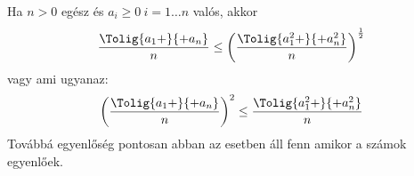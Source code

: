    Ha $n>0$ egész és $a_{i}\ge 0\ i=1\hdots n$ valós, akkor
   \begin{equation*}
   \frac{\Tolig{a_{1}+}{+a_{n}}}{n} \le 
   {\left( \frac{\Tolig{a_{1}^{2}+}{+a_{n}^{2}}}{n} \right) }^{\frac{1}{2}}
   \end{equation*}
   vagy ami ugyanaz:
   \begin{equation*}
   {\left( \frac{\Tolig{a_{1}+}{+a_{n}}}{n} \right) }^{2}\le 
   \frac{\Tolig{a_{1}^{2}+}{+a_{n}^{2}}}{n}
   \end{equation*}
   Továbbá egyenlőség pontosan abban az esetben áll fenn amikor a számok egyenlőek.
